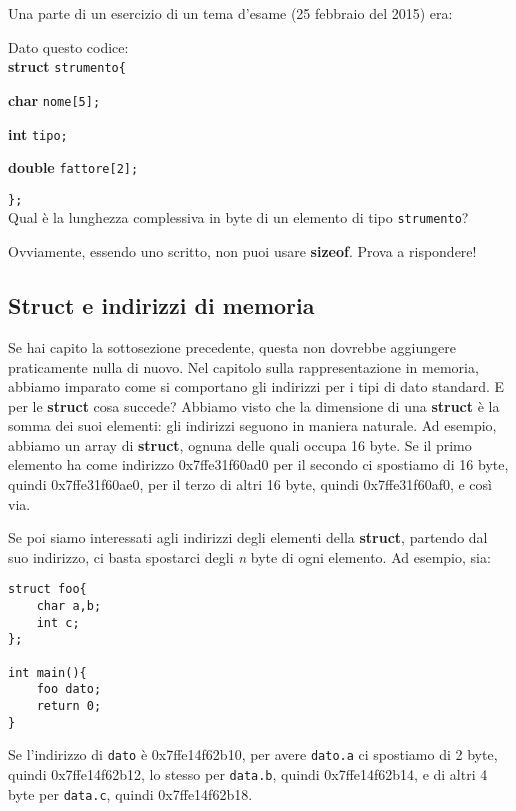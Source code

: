Una parte di un esercizio di un tema d'esame (25 febbraio del 2015) era:
\begin{shaded}
Dato questo codice:\\

\textbf{struct} \verb|strumento{|
    
\qquad\textbf{char} \verb|nome[5];|

\qquad\textbf{int} \verb|tipo;|

\qquad\textbf{double} \verb|fattore[2];|

\verb|};|\\

Qual è la lunghezza complessiva in byte di un elemento di tipo \verb|strumento|?
\end{shaded}

Ovviamente, essendo uno scritto, non puoi usare \textbf{sizeof}. Prova a rispondere!
\subsection{Struct e indirizzi di memoria}
Se hai capito la sottosezione precedente, questa non dovrebbe aggiungere praticamente nulla di nuovo. Nel capitolo sulla rappresentazione in memoria, abbiamo imparato come si comportano gli indirizzi per i tipi di dato standard. E per le \textbf{struct} cosa succede? Abbiamo visto che la dimensione di una \textbf{struct} è la somma dei suoi elementi: gli indirizzi seguono in maniera naturale. Ad esempio, abbiamo un array di \textbf{struct}, ognuna delle quali occupa 16 byte.  Se il primo elemento ha come indirizzo  0x7ffe31f60ad0 per il secondo ci spostiamo di 16 byte, quindi 0x7ffe31f60ae0, per il terzo di altri 16 byte, quindi 0x7ffe31f60af0, e così via. 

Se poi siamo interessati agli indirizzi degli elementi della \textbf{struct}, partendo dal suo indirizzo, ci basta spostarci degli \emph{n} byte di ogni elemento. Ad esempio, sia:
\begin{lstlisting}
struct foo{
	char a,b;
	int c;
};

int main(){
	foo dato;
	return 0;
}
\end{lstlisting}
Se l'indirizzo di \verb|dato| è 0x7ffe14f62b10, per avere \verb|dato.a| ci spostiamo di 2 byte, quindi 0x7ffe14f62b12, lo stesso per \verb|data.b|, quindi 0x7ffe14f62b14, e di altri 4 byte per \verb|data.c|, quindi 0x7ffe14f62b18.\\

